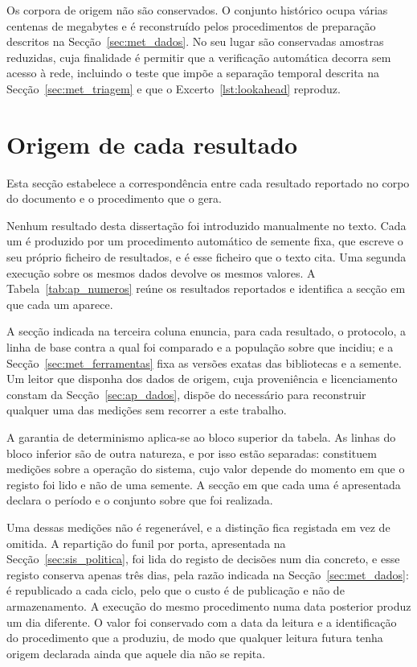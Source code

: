 Os corpora de origem não são conservados. O conjunto histórico ocupa várias centenas de megabytes
e é reconstruído pelos procedimentos de preparação descritos na Secção~\ref{sec:met_dados}. No seu
lugar são conservadas amostras reduzidas, cuja finalidade é permitir que a verificação automática
decorra sem acesso à rede, incluindo o teste que impõe a separação temporal descrita na
Secção~\ref{sec:met_triagem} e que o Excerto~\ref{lst:lookahead} reproduz.

\section{Origem de cada resultado}
\label{sec:ap_numeros}

Esta secção estabelece a correspondência entre cada resultado reportado no corpo do documento e o
procedimento que o gera.

Nenhum resultado desta dissertação foi introduzido manualmente no texto. Cada um é produzido por um
procedimento automático de semente fixa, que escreve o seu próprio ficheiro de resultados, e é esse
ficheiro que o texto cita. Uma segunda execução sobre os mesmos dados devolve os mesmos valores. A
Tabela~\ref{tab:ap_numeros} reúne os resultados reportados e identifica a secção em que cada um
aparece.

A secção indicada na terceira coluna enuncia, para cada resultado, o protocolo, a linha de base contra a qual foi comparado e a população sobre que
incidiu; e a Secção~\ref{sec:met_ferramentas} fixa as versões exatas das bibliotecas e a semente.
Um leitor que disponha dos dados de origem, cuja proveniência e licenciamento constam da
Secção~\ref{sec:ap_dados}, dispõe do necessário para reconstruir qualquer uma das medições sem
recorrer a este trabalho.

A garantia de determinismo aplica-se ao bloco superior da tabela. As linhas do bloco inferior são de
outra natureza, e por isso estão separadas: constituem medições sobre a operação do sistema, cujo
valor depende do momento em que o registo foi lido e não de uma semente. A secção em que cada uma é
apresentada declara o período e o conjunto sobre que foi realizada.

Uma dessas medições não é regenerável, e a distinção fica registada em vez de omitida. A repartição
do funil por porta, apresentada na Secção~\ref{sec:sis_politica}, foi lida do registo de decisões
num dia concreto, e esse registo conserva apenas três dias, pela razão indicada na
Secção~\ref{sec:met_dados}: é republicado a cada ciclo, pelo que o custo é de publicação e não de
armazenamento. A execução do mesmo procedimento numa data posterior produz um dia diferente.
O valor foi conservado com a data da leitura e a identificação do procedimento que a produziu, de
modo que qualquer leitura futura tenha origem declarada ainda que aquele dia não se repita.

